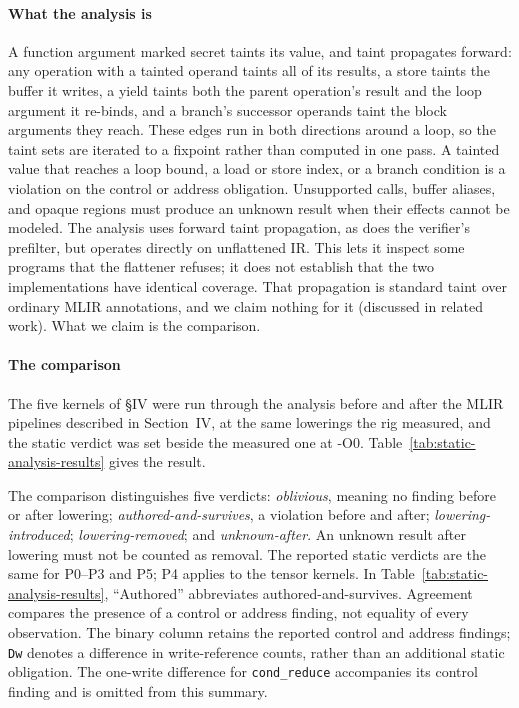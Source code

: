 \paragraph{What the analysis is} A function argument marked secret taints its value, and taint propagates forward: any operation with a tainted operand taints all of its results, a store taints the buffer it writes, a yield taints both the parent operation's result and the loop argument it re-binds, and a branch's successor operands taint the block arguments they reach.
These edges run in both directions around a loop, so the taint sets are iterated to a fixpoint rather than computed in one pass.
A tainted value that reaches a loop bound, a load or store index, or a branch condition is a violation on the control or address obligation.
Unsupported calls, buffer aliases, and opaque regions must produce an unknown result when their effects cannot be modeled.
The analysis uses forward taint propagation, as does the verifier's prefilter, but operates directly on unflattened IR.
This lets it inspect some programs that the flattener refuses; it does not establish that the two implementations have identical coverage.
That propagation is standard taint over ordinary MLIR annotations, and we claim nothing for it (discussed in related work).
What we claim is the comparison.

\paragraph{The comparison} The five kernels of §IV were run through the analysis before and after the MLIR pipelines described in Section~IV, at the same lowerings the rig measured, and the static verdict was set beside the measured one at -O0.
Table~\ref{tab:static-analysis-results} gives the result.

The comparison distinguishes five verdicts: \emph{oblivious}, meaning no finding before or after lowering; \emph{authored-and-survives}, a violation before and after; \emph{lowering-introduced}; \emph{lowering-removed}; and \emph{unknown-after}.
An unknown result after lowering must not be counted as removal.
The reported static verdicts are the same for P0--P3 and P5; P4 applies to the tensor kernels.
In Table~\ref{tab:static-analysis-results}, ``Authored'' abbreviates authored-and-survives.
Agreement compares the presence of a control or address finding, not equality of every observation.
The binary column retains the reported control and address findings; \texttt{Dw} denotes a difference in write-reference counts, rather than an additional static obligation.
The one-write difference for \texttt{cond\_reduce} accompanies its control finding and is omitted from this summary.

